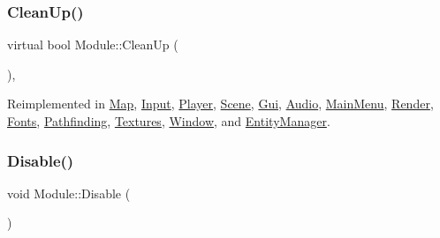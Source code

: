 \mbox{\label{class_module_a77d7a006e42c0bd10110e1adbd4598cb}} 
\subsubsection{\texorpdfstring{CleanUp()}{CleanUp()}}
{\footnotesize\ttfamily virtual bool Module\+::\+Clean\+Up (\begin{DoxyParamCaption}{ }\end{DoxyParamCaption})\hspace{0.3cm}{\ttfamily [inline]}, {\ttfamily [virtual]}}



Reimplemented in \mbox{\hyperlink{class_map_acc2cb08f31839bf0545d7b47100b3884}{Map}}, \mbox{\hyperlink{class_input_a6cad2fca1092afa12ae299dcc4fe7c49}{Input}}, \mbox{\hyperlink{class_player_aebe8ef704dff5d2b676144c36f4217d8}{Player}}, \mbox{\hyperlink{class_scene_aac06490e9440c38b6970740a099ad14a}{Scene}}, \mbox{\hyperlink{class_gui_aefd3608cd8ada040443efcffb1f316f3}{Gui}}, \mbox{\hyperlink{class_audio_a15ae1aa195c9c5f754850e5884bd2dc9}{Audio}}, \mbox{\hyperlink{class_main_menu_a87852de56aa660cfd0c2f578f9114773}{Main\+Menu}}, \mbox{\hyperlink{class_render_a96a6770025fabf47750ef73600b3d58e}{Render}}, \mbox{\hyperlink{class_fonts_afc4912317ca40199a71f7db1024c006d}{Fonts}}, \mbox{\hyperlink{class_pathfinding_ac377b4477dad76360fdb4c64e52d80f6}{Pathfinding}}, \mbox{\hyperlink{class_textures_ae1e354e40c2ead6427152e70b92ad43e}{Textures}}, \mbox{\hyperlink{class_window_aed8304cc37c842ff56f5428524163fea}{Window}}, and \mbox{\hyperlink{class_entity_manager_abe98672d529a2abf89bba1204338b6c0}{Entity\+Manager}}.

\mbox{\label{class_module_a18ea1b1701a3d4e26ff77400a85b6916}} 
\subsubsection{\texorpdfstring{Disable()}{Disable()}}
{\footnotesize\ttfamily void Module\+::\+Disable (\begin{DoxyParamCaption}{ }\end{DoxyParamCaption})\hspace{0.3cm}{\ttfamily [inline]}}

\mbox{\label{class_module_a549c4b33f582f353436b57de5dfd39da}} 
